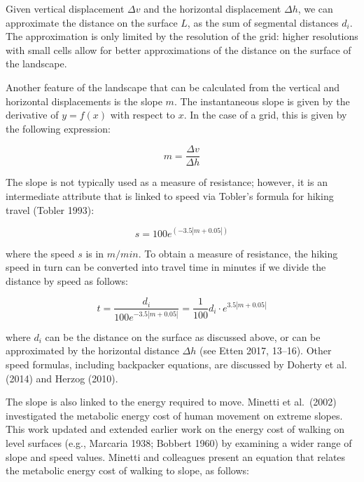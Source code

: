\documentclass[]{elsarticle} %
\begin{document}
Given vertical displacement \(\Delta v\) and the horizontal displacement
\(\Delta h\), we can approximate the distance on the surface \(L\), as
the sum of segmental distances \(d_i\). The approximation is only
limited by the resolution of the grid: higher resolutions with small
cells allow for better approximations of the distance on the surface of
the landscape.

Another feature of the landscape that can be calculated from the
vertical and horizontal displacements is the slope \(m\). The
instantaneous slope is given by the derivative of \(y = f(x)\) with
respect to \(x\). In the case of a grid, this is given by the following
expression:

\begin{equation} \label{eq:3}m = \frac{\Delta v}{\Delta h}\end{equation}

The slope is not typically used as a measure of resistance; however, it
is an intermediate attribute that is linked to speed via Tobler's
formula for hiking travel (Tobler 1993):

\begin{equation} \label{eq:4}s = 100e^{(-3.5|m + 0.05|)}\end{equation}

\noindent where the speed \(s\) is in \(m/min\). To obtain a measure of
resistance, the hiking speed in turn can be converted into travel time
in minutes if we divide the distance by speed as follows:

\begin{equation} \label{eq:5}t = \frac{d_i}{100e^{-3.5|m + 0.05|}} = \frac{1}{100}d_i \cdot e^{3.5|m + 0.05|}\end{equation}

\noindent where \(d_i\) can be the distance on the surface as discussed
above, or can be approximated by the horizontal distance \(\Delta h\)
(see Etten 2017, 13--16). Other speed formulas, including backpacker
equations, are discussed by Doherty et al. (2014) and Herzog (2010).

The slope is also linked to the energy required to move. Minetti et
al.~(2002) investigated the metabolic energy cost of human movement on
extreme slopes. This work updated and extended earlier work on the
energy cost of walking on level surfaces (e.g., Marcaria 1938; Bobbert
1960) by examining a wider range of slope and speed values. Minetti and
colleagues present an equation that relates the metabolic energy cost of
walking to slope, as follows:
\end{document}
